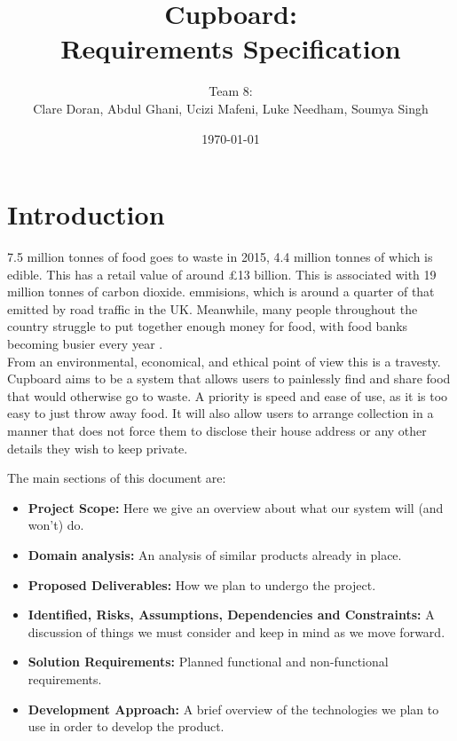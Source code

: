 \documentclass[12pt]{article}
\title{Cupboard:\\Requirements Specification}
\author{Team 8:\\Clare Doran, Abdul Ghani, Ucizi Mafeni, Luke Needham, Soumya Singh}
\date{\today}
\begin{document}
\maketitle

\tableofcontents
\clearpage


\section{Introduction}

7.5 million tonnes of food goes to waste in 2015, 4.4 million tonnes of which is edible.
This has a retail value of around £13 billion. This is associated with 19 million tonnes of carbon dioxide.
emmisions, which is around a quarter of that emitted by road traffic in the UK\cite{wrap}.
Meanwhile,  many people throughout the country struggle to put together enough 
money for food, with food banks becoming busier every year \cite{trussel}.\\
From an environmental, economical, and ethical point of view this is a travesty.\\
Cupboard aims to be a system that allows users to painlessly find and share food
that would otherwise go to waste. A priority is speed and ease of use, as it is
too easy to just throw away food. 
It will also allow users to arrange collection in a manner that does not force
them to disclose their house address or any other details they wish to keep
private.

The main sections of this document are:
\begin{itemize}
	\item \textbf{Project Scope:} Here we give an overview about what our system will (and won't) do.
	\item \textbf{Domain analysis:} An analysis of similar products already in place.
	\item \textbf{Proposed Deliverables:} How we plan to undergo the project.
	\item \textbf{Identified, Risks, Assumptions, Dependencies and Constraints:} A discussion of things we must consider and keep in mind as we move forward.
	\item \textbf{Solution Requirements:} Planned functional and non-functional requirements.
	\item \textbf{Development Approach:} A brief overview of the technologies we plan to use in order to develop the product.
\end{itemize}
\end{document}

